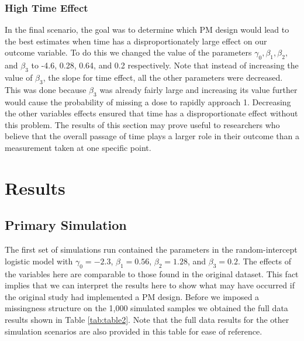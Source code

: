 \documentclass{svjour3}                     %
\begin{document}
\subsubsection{High Time Effect}
In the final scenario, the goal was to determine which PM design would lead to the best estimates when time has a disproportionately large effect on our outcome variable. To do this we changed the value of the parameters $\gamma_0, \beta_1, \beta_2,$ and $\beta_3$ to -4.6, 0.28, 0.64, and 0.2 respectively. Note that instead of increasing the value of $\beta_3$, the slope for time effect, all the other parameters were decreased. This was done because $\beta_3$ was already fairly large and increasing its value further would cause the probability of missing a dose to rapidly approach 1. Decreasing the other variables effects ensured that time has a disproportionate effect without this problem. The results of this section may prove useful to researchers who believe that the overall passage of time plays a larger role in their outcome than a measurement taken at one specific point. \par

\section{Results}
\label{sec:3}
\subsection{Primary Simulation}
\label{sec:3.1}
The first set of simulations run contained the parameters in the random-intercept logistic model with $\gamma_0 = -2.3$, $\beta_1 = 0.56$, $\beta_2 = 1.28$, and $\beta_3 = 0.2$. The effects of the variables here are comparable to those found in the original dataset. This fact implies that we can interpret the results here to show what may have occurred if the original study had implemented a PM design. Before we imposed a missingness structure on the 1,000 simulated samples we obtained the full data results shown in Table \ref{tab:table2}. Note that the full data results for the other simulation scenarios are also provided in this table for ease of reference.
\end{document}
